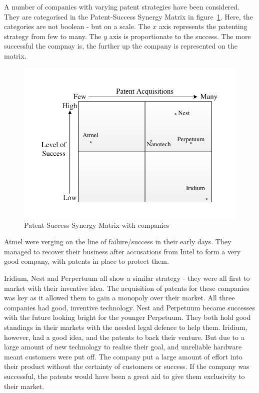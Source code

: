 {}

A number of companies with varying patent strategies have been considered.
They are categorised in the Patent-Success Synergy Matrix in figure~\ref{fig:pssm:companies}.
Here, the categories are not boolean - but on a scale. 
The $x$ axis represents the patenting strategy from few to many.
The $y$ axis is proportionate to the success. 
The more successful the compnay is, the further up the company is represented on the matrix.
\begin{figure}
\centering
\includegraphics{Figures/SuccessMatrixScale.pdf}
\caption{Patent-Success Synergy Matrix with companies}%
\label{fig:pssm:companies}
\end{figure}

Atmel were verging on the line of failure/success in their early days. 
They managed to recover their business after accusations from Intel to form a very good company, with patents in place to protect them.

Iridium, Nest and Perpertuum all show a similar strategy - they were all first to market with their inventive idea.
The acquisition of patents for these companies was key as it allowed them to gain a monopoly over their market. 
All three companies had good, inventive technology.
Nest and Perpetuum became successes with the future looking bright for the younger Perpetuum. 
They both hold good standings in their markets with the needed legal defence to help them.
Iridium, however, had a good idea, and the patents to back their venture. 
But due to a large amount of new technology to realise their goal, and unreliable hardware meant customers were put off.
The company put a large amount of effort into their product without the certainty of customers or success. 
If the company was successful, the patents would have been a great aid to give them exclusivity to their market.

